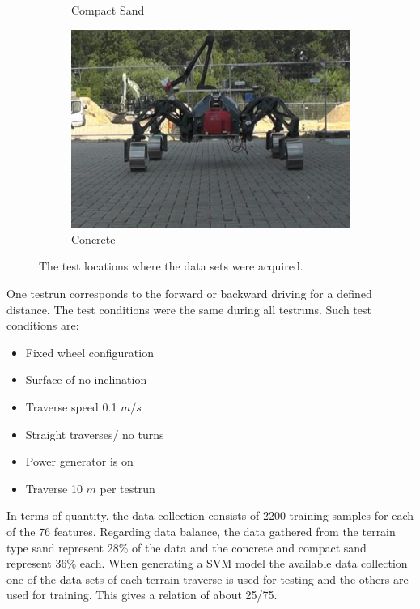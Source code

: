 \documentclass{article}
\begin{document}
\begin{figure}[!htb]
\begin{subfigure}[t]{0.3\textwidth}
        \caption{Compact Sand}
    \end{subfigure}
    \qquad
    \begin{subfigure}[t]{0.3\textwidth}
        \includegraphics[width=\textwidth]{../figures/concrete_v2.png}
        \caption{Concrete}
    \end{subfigure}
 \caption{The test locations where the data sets were acquired.}
 \label{fig:TestLocs}
\end{figure}

One testrun corresponds to the forward or backward driving for a defined distance. The test conditions were the same during all testruns. Such test conditions are:
\begin{itemize}
\item Fixed wheel configuration
\item Surface of no inclination
\item Traverse speed 0.1 $m/s$
\item Straight traverses/ no turns
\item Power generator is on
\item Traverse 10 $m$ per testrun
\end{itemize}

In terms of quantity, the data collection consists of 2200 training samples for each of the 76 features. Regarding data balance, the data gathered from the terrain type sand represent 28\% of the data and the concrete and compact sand represent 36\% each. 
When generating a SVM model the available data collection one of the data sets of each terrain traverse is used for testing and the others are used for training. This gives a relation of about 25/75.
\end{document}
